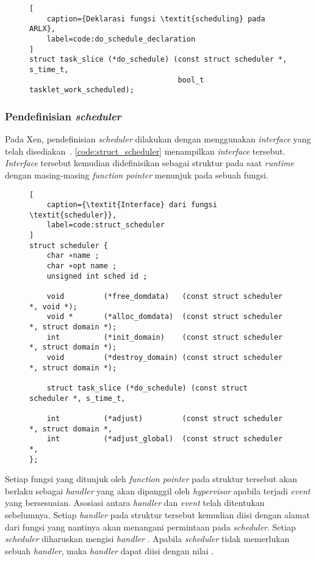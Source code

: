 \begin{figure}[!ht]
\begin{lstlisting}[
	caption={Deklarasi fungsi \textit{scheduling} pada ARLX},
	label=code:do_schedule_declaration
]
struct task_slice (*do_schedule) (const struct scheduler *, s_time_t,
                                  bool_t tasklet_work_scheduled);
\end{lstlisting}
\end{figure}

\subsubsection{Pendefinisian \textit{scheduler}}
\label{section:definisi_scheduler}

Pada Xen, pendefinisian \textit{scheduler} dilakukan dengan menggunakan \textit{interface} yang
telah disediakan~\citep[p.~218]{Chisnall2014}. \autoref{code:struct_scheduler} menampilkan
\textit{interface} tersebut. \textit{Interface} tersebut kemudian didefinisikan sebagai
struktur pada saat \textit{runtime} dengan masing-masing \textit{function pointer} menunjuk pada
sebuah fungsi.

\begin{figure}[!ht]
\begin{lstlisting}[
	caption={\textit{Interface} dari fungsi \textit{scheduler}},
	label=code:struct_scheduler
]
struct scheduler {
    char ∗name ;
    char ∗opt name ;
    unsigned int sched id ;

    void         (*free_domdata)   (const struct scheduler *, void *);
    void *       (*alloc_domdata)  (const struct scheduler *, struct domain *);
    int          (*init_domain)    (const struct scheduler *, struct domain *);
    void         (*destroy_domain) (const struct scheduler *, struct domain *);

    struct task_slice (*do_schedule) (const struct scheduler *, s_time_t,

    int          (*adjust)         (const struct scheduler *, struct domain *,
    int          (*adjust_global)  (const struct scheduler *,
};
\end{lstlisting}
\end{figure}

Setiap fungsi yang ditunjuk oleh \textit{function pointer} pada struktur
tersebut akan berlaku sebagai \textit{handler} yang akan dipanggil oleh \textit{hypervisor}
apabila terjadi \textit{event} yang bersesuaian. Asosiasi antara \textit{handler} dan
\textit{event} telah ditentukan sebelumnya. Setiap \textit{handler} pada struktur tersebut
kemudian diisi dengan alamat dari fungsi yang nantinya akan menangani permintaan pada
\textit{scheduler}. Setiap \textit{scheduler} diharuskan mengisi \textit{handler}
. Apabila \textit{scheduler} tidak memerlukan sebuah \textit{handler}, maka
\textit{handler} dapat diisi dengan nilai .

